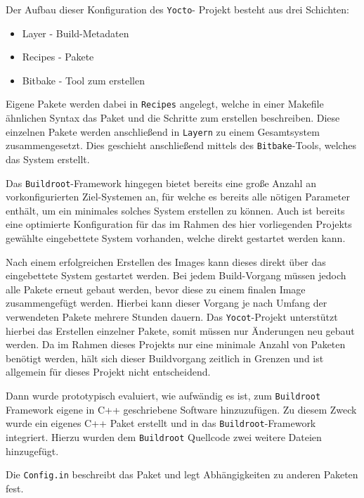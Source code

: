 Der Aufbau dieser Konfiguration des \passthrough{\lstinline!Yocto!}-
Projekt besteht aus drei Schichten:

\begin{itemize}
\tightlist
\item
  Layer - Build-Metadaten
\item
  Recipes - Pakete
\item
  Bitbake - Tool zum erstellen
\end{itemize}

Eigene Pakete werden dabei in \passthrough{\lstinline!Recipes!}
angelegt, welche in einer Makefile ähnlichen Syntax das Paket und die
Schritte zum erstellen beschreiben. Diese einzelnen Pakete werden
anschließend in \passthrough{\lstinline!Layern!} zu einem Gesamtsystem
zusammengesetzt. Dies geschieht anschließend mittels des
\passthrough{\lstinline!Bitbake!}-Tools, welches das System erstellt.

Das \passthrough{\lstinline!Buildroot!}-Framework hingegen bietet
bereits eine große Anzahl an vorkonfigurierten Ziel-Systemen an, für
welche es bereits alle nötigen Parameter enthält, um ein minimales
solches System erstellen zu können. Auch ist bereits eine optimierte
Konfiguration für das im Rahmen des hier vorliegenden Projekts gewählte
eingebettete System vorhanden, welche direkt gestartet werden kann.

Nach einem erfolgreichen Erstellen des Images kann dieses direkt über
das eingebettete System gestartet werden. Bei jedem Build-Vorgang müssen
jedoch alle Pakete erneut gebaut werden, bevor diese zu einem finalen
Image zusammengefügt werden. Hierbei kann dieser Vorgang je nach Umfang
der verwendeten Pakete mehrere Stunden dauern. Das
\passthrough{\lstinline!Yocot!}-Projekt unterstützt hierbei das
Erstellen einzelner Pakete, somit müssen nur Änderungen neu gebaut
werden. Da im Rahmen dieses Projekts nur eine minimale Anzahl von
Paketen benötigt werden, hält sich dieser Buildvorgang zeitlich in
Grenzen und ist allgemein für dieses Projekt nicht entscheidend.

Dann wurde prototypisch evaluiert, wie aufwändig es ist, zum
\passthrough{\lstinline!Buildroot!} Framework eigene in C++ geschriebene
Software hinzuzufügen. Zu diesem Zweck wurde ein eigenes C++ Paket
erstellt und in das \passthrough{\lstinline!Buildroot!}-Framework
integriert. Hierzu wurden dem \passthrough{\lstinline!Buildroot!}
Quellcode zwei weitere Dateien hinzugefügt.

Die \passthrough{\lstinline!Config.in!} beschreibt das Paket und legt
Abhängigkeiten zu anderen Paketen fest.

